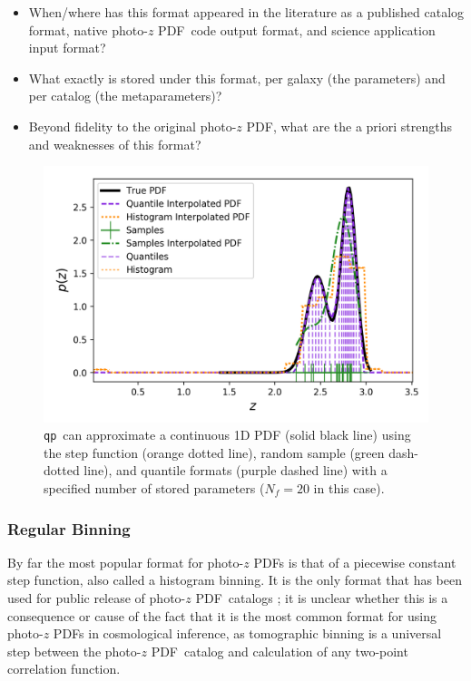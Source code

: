 \documentclass[\docopts]{\docclass}
\newcommand{\qp}{\texttt{qp}}
\newcommand{\pz}{photo-$z$ PDF}
\begin{document}
\begin{itemize}
  \item When/where has this format appeared in the literature as a published 
catalog format, native \pz\ code output format, and science application input 
format?
  \item What exactly is stored under this format, per galaxy (the parameters) 
and per catalog (the metaparameters)?
  \item Beyond fidelity to the original \pz, what are the a priori strengths 
and weaknesses of this format?
\end{itemize}

\begin{figure}
  \includegraphics[width=0.9\columnwidth]{figures/demo_pz.png}
  \caption{\qp\ can approximate a continuous 1D PDF (solid black line) using 
the step function (orange dotted line), random sample (green dash-dotted line), 
and quantile formats (purple dashed line) with a specified number of stored 
parameters ($N_{f}=20$ in this case).
  \label{fig:qp}}
\end{figure}

\subsubsection{Regular Binning}
\label{sec:bins}

By far the most popular format for \pz s is that of a piecewise constant step 
function, also called a histogram binning.  It is the only format that has been 
used for public release of \pz\ catalogs \citep{tanaka_photometric_2017, 
sheldon_photometric_2012}; it is unclear whether this is a consequence or cause 
of the fact that it is the most common format for using \pz s in cosmological 
inference, as tomographic binning is a universal step between the \pz\ catalog 
and calculation of any two-point correlation function.
\end{document}
